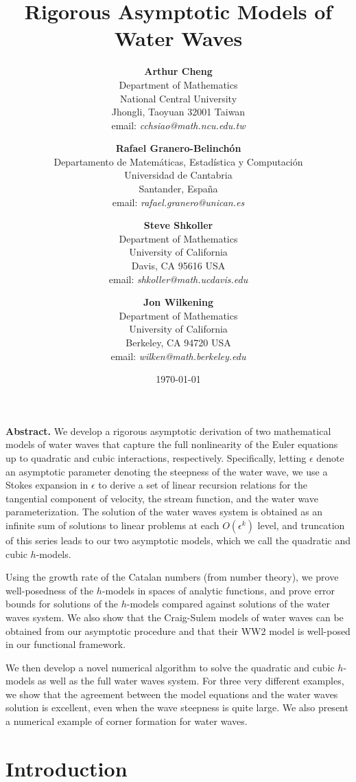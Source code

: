 \documentclass[11pt]{article}
\title{{\bf Rigorous Asymptotic Models of Water Waves }}
\author{
{\small {\bf Arthur Cheng}}
\vspace{-.05 in}
\\{\footnotesize Department of Mathematics}
\vspace{-.05 in}
\\{\footnotesize National Central University}
\vspace{-.05 in}
\\{\footnotesize Jhongli, Taoyuan 32001 Taiwan}
\vspace{-.05 in}
\\{\footnotesize email: {\it cchsiao@math.ncu.edu.tw}}
\and
{\small {\bf Rafael Granero-Belinch\'on}}
\vspace{-.05 in}
\\{\footnotesize Departamento de Matem\'aticas, Estad\'istica y Computaci\'on}
\vspace{-.05 in}
\\{\footnotesize Universidad de Cantabria}
\vspace{-.05 in}
\\{\footnotesize Santander, Espa\~na}
\vspace{-.05 in}
\\{\footnotesize email: {\it rafael.granero@unican.es}}
\and
 {\small {\bf Steve Shkoller}}
 \vspace{-.05 in}
\\{\footnotesize Department of Mathematics}
\vspace{-.05 in}
\\{\footnotesize University of California}
\vspace{-.05 in}
\\{\footnotesize Davis, CA 95616 USA}
\vspace{-.05 in}
\\{\footnotesize email: {\it shkoller@math.ucdavis.edu}}
\and
{\small {\bf Jon Wilkening}}
\vspace{-.05 in}
\\{\footnotesize Department of Mathematics}
\vspace{-.05 in}
\\{\footnotesize University of California}
\vspace{-.05 in}
\\{\footnotesize Berkeley, CA 94720 USA}
\vspace{-.05 in}
\\{\footnotesize email: {\it wilken@math.berkeley.edu}}
}
\date{\today}
\theoremstyle{plain}
\theoremstyle{definition}
\theoremstyle{definition}
\begin{document}
\maketitle


{\footnotesize
  {\bf Abstract.}
We develop a rigorous asymptotic derivation of two mathematical models
of water waves that capture the full nonlinearity of the Euler
equations up to quadratic and cubic interactions, respectively.
Specifically, letting $ \epsilon $ denote an asymptotic parameter
denoting the steepness of the water wave, we use a Stokes expansion in
$ \epsilon $ to derive a set of linear recursion relations for the
tangential component of velocity, the stream function, and the water
wave parameterization.  The solution of the water waves system is
obtained as an infinite sum of solutions to linear problems at each
$O( \epsilon ^k)$ level, and truncation of this series leads to our
two asymptotic models, which we call the quadratic and cubic
$h$-models.

Using the growth rate of the Catalan numbers (from number theory), we
prove well-posedness of the $h$-models in spaces of analytic
functions, and prove error bounds for solutions of the $h$-models
compared against solutions of the water waves system.  We also show
that the Craig-Sulem models of water waves can be obtained from our
asymptotic procedure and that their WW2 model is well-posed in our
functional framework.

We then develop a novel numerical algorithm to solve the quadratic and
cubic $h$-models as well as the full water waves system. For three
very different examples, we show that the agreement between the model
equations and the water waves solution is excellent, even when the
wave steepness is quite large.  We also present a numerical example of
corner formation for water waves.

}


{\small
\tableofcontents}

\section{Introduction}
\end{document}
